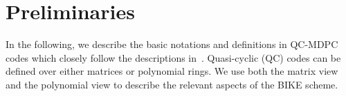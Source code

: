 \documentclass[runningheads]{llncs}
\begin{document}
\section{Preliminaries}
\label{sec::prelim}

In the following, we describe the basic notations and definitions
in QC-MDPC codes which closely follow the descriptions in~\cite{aragon2017bike}. Quasi-cyclic (QC) codes can be  defined  over either matrices or polynomial rings.
We use both the matrix view and the polynomial view to
describe the relevant aspects of the BIKE scheme.


\newcommand{\tabincell}[2]{\begin{tabular}{@{}#1@{}}#2\end{tabular}}
\end{document}
